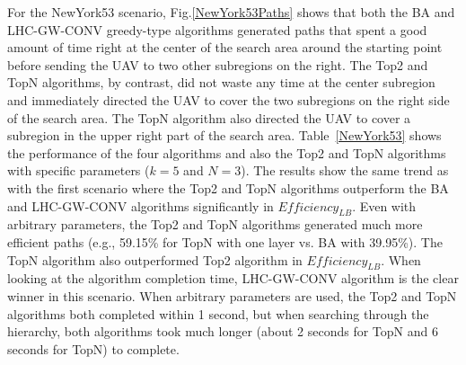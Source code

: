 \documentclass[journal]{IEEEtran}
\begin{document}
For the NewYork53 scenario, Fig.\ref{NewYork53Paths} shows that both the BA and LHC-GW-CONV greedy-type algorithms generated paths that spent a good amount of time right at the center of the search area around the starting point before sending the UAV to two other subregions on the right. The Top2 and TopN algorithms, by contrast, did not waste any time at the center subregion and immediately directed the UAV to cover the two subregions on the right side of the search area. The TopN algorithm also directed the UAV to cover a subregion in the upper right part of the search area. Table~\ref{NewYork53} shows the performance of the four algorithms and also the Top2 and TopN algorithms with specific parameters ($k=5$ and $N=3$). The results show the same trend as with the first scenario where the Top2 and TopN algorithms outperform the BA and LHC-GW-CONV algorithms significantly in $\mathit{Efficiency_{LB}}$. Even with arbitrary parameters, the Top2 and TopN algorithms generated much more efficient paths (e.g., 59.15\% for TopN with one layer vs. BA with 39.95\%). The TopN algorithm also outperformed Top2 algorithm in $\mathit{Efficiency_{LB}}$. When looking at the algorithm completion time, LHC-GW-CONV algorithm is the clear winner in this scenario. When arbitrary parameters are used, the Top2 and TopN algorithms both completed within 1 second, but when searching through the hierarchy, both algorithms took much longer (about 2 seconds for TopN and 6 seconds for TopN) to complete.

\end{document}
